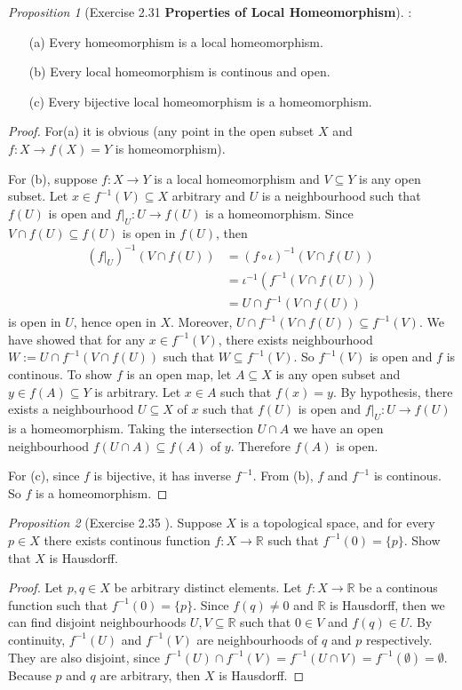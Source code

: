 \documentclass[a4paper]{article}
\theoremstyle{remark}
\newtheorem{prop}{Proposition}
\newcommand{\er}{\mathbb{R}} %
\newcommand{\subhim}{\subseteq} %
\begin{document}
\begin{prop}[Exercise 2.31 \textbf{Properties of Local Homeomorphism}] :
	\begin{enumerate}[nolistsep]
		\item [(a)] Every homeomorphism is a local homeomorphism.
		\item [(b)] Every local homeomorphism is continous and open.
		\item [(c)] Every bijective local homeomorphism is a homeomorphism.
	\end{enumerate}
\end{prop}
\begin{proof}
	For(a) it is obvious (any point in the open subset $X$ and $f : X\to f(X)=Y$ is homeomorphism). 
	
	For (b), suppose $f : X \to Y$ is a local homeomorphism and $V \subhim Y$ is any open subset.  Let $x \in f^{-1}(V) \subhim X$ arbitrary and $U$ is a neighbourhood such that $f(U)$ is open and $f|_U : U \to f(U)$ is a homeomorphism. Since $V \cap f(U) \subhim f(U)$ is open in $f(U)$, then
	\begin{align*}
	(f|_U)^{-1}(V \cap f(U))&= (f \circ \iota)^{-1}(V \cap f(U))\\ &= \iota^{-1}(f^{-1}(V \cap f(U))) \\ &= U \cap f^{-1}(V \cap f(U))
	\end{align*}
	is open in $U$, hence open in $X$. Moreover, $U \cap f^{-1}(V \cap f(U)) \subhim f^{-1}(V)$. We have showed that for any $x \in f^{-1}(V)$, there exists neighbourhood $W:= U \cap f^{-1}(V \cap f(U))$ such that $W \subhim f^{-1}(V)$. So $f^{-1}(V)$ is open and $f$ is continous. To show $f$ is an open map, let $A \subhim X$ is any open subset and $y \in f(A) \subhim Y$ is arbitrary. Let $x \in A$ such that $f(x) = y$. By hypothesis, there exists a neighbourhood $U \subhim X$ of $x$ such that $f(U)$ is open and $f|_U : U \to f(U)$ is a homeomorphism. Taking the intersection $U \cap A$ we have an open neighbourhood $f(U \cap A) \subhim f(A)$ of $y$. Therefore $f(A)$ is open. 
	
	For (c), since $f$ is bijective, it has inverse $f^{-1}$. From (b), $f$ and $f^{-1}$ is continous. So $f$ is a homeomorphism.
\end{proof}

\begin{prop}[Exercise 2.35 \cite{LeeTM}]
Suppose $X$ is a topological space, and for every $p \in X$ there exists continous function $f : X \to \er$ such that $f^{-1}(0)=\{p\}$. Show that $X$ is Hausdorff. 
\end{prop}
\begin{proof}
Let $p,q \in X$ be arbitrary distinct elements. Let $f : X \to \er$ be a continous function such that $f^{-1}(0)=\{p\}$. Since $f(q) \neq 0 $ and $\er$ is Hausdorff, then we can find disjoint neighbourhoods $U,V \subhim \er$ such that $0 \in V$ and $f(q) \in U$. By continuity, $f^{-1}(U)$ and $f^{-1}(V)$ are neighbourhoods of $q$ and $p$ respectively. They are also disjoint, since $f^{-1}(U) \cap f^{-1}(V)= f^{-1}(U \cap V) = f^{-1}(\emptyset) = \emptyset$. Because $p$ and $q$ are arbitrary, then $X$ is Hausdorff.
\end{proof}
\end{document}
